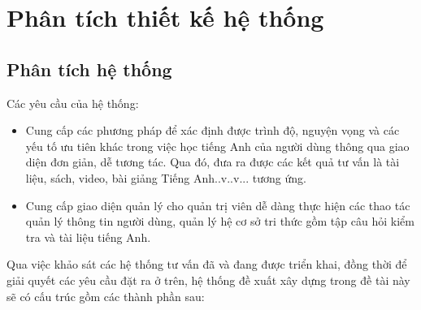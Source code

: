 \makeatletter
\def\BState{\State\hskip-\ALG@thistlm}
\makeatother

\chapter{Phân tích thiết kế hệ thống} \label{design-analysis}

\ifpdf
    \graphicspath{{DesignAnalysis/Chapter1Figs/PNG/}{DesignAnalysis/Chapter1Figs/PDF/}{DesignAnalysis/Chapter1Figs/}}
\else
    \graphicspath{{DesignAnalysis/Chapter1Figs/EPS/}{DesignAnalysis/Chapter1Figs/}}
\fi

\section{Phân tích hệ thống}
Các yêu cầu của hệ thống:
\begin{itemize}
	\item Cung cấp các phương pháp để xác định được trình độ, nguyện vọng và các yếu tố ưu tiên khác trong việc học tiếng Anh của người dùng thông qua giao diện đơn giản, dễ tương tác. Qua đó, đưa ra được các kết quả tư vấn là tài liệu, sách, video, bài giảng Tiếng Anh..v..v... tương ứng.
	\item Cung cấp giao diện quản lý cho quản trị viên dễ dàng thực hiện các thao tác quản lý thông tin người dùng, quản lý hệ cơ sở tri thức gồm tập câu hỏi kiểm tra và tài liệu tiếng Anh.
\end{itemize}
Qua việc khảo sát các hệ thống tư vấn đã và đang được triển khai, đồng thời để giải quyết các yêu cầu đặt ra ở trên, hệ thống đề xuất xây dựng trong đề tài này sẽ có cấu trúc gồm các thành phần sau:

